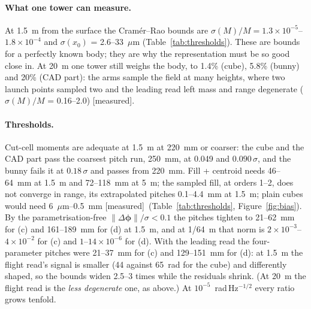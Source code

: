 \documentclass[10pt,a4paper]{article}
\newcommand{\provisional}{\textcolor{orange!70!black}{\textsf{\small[provisional --- research scripts; TASK-S5-29 regenerates this with Cavendish]}}}
\newcommand{\tagM}{\textsf{\small[measured]}}
\newcommand{\Cutcell}{Cut-cell moments}
\begin{document}
\paragraph{What one tower can measure.} At 1.5~m from the surface the Cram\'er--Rao bounds are
$\sigma(M)/M = 1.3\times10^{-5}$--$1.8\times10^{-4}$ and $\sigma(x_0)$ = 2.6--33~$\mu$m
(Table~\ref{tab:thresholds}). These are bounds for a perfectly known body; they are why the
representation must be so good close in. At 20~m one tower still weighs the body, to 1.4\% (cube),
5.8\% (bunny) and 20\% (CAD part): the arms sample the field at many heights, where two launch points
sampled two and the leading read left mass and range degenerate ($\sigma(M)/M$ = 0.16--2.0) \tagM.

\begin{table}[tbp]\centering\small
\caption{One AION-10 tower, a body passing at 1~m\,s$^{-1}$, 61 shots, $\sigma=5\times10^{-5}$~rad
per shot: the peak phase, the Cram\'er--Rao bound on the mass, and the pitch (mm) at which each
representation's largest bias over (ln $M$, $x_0$, $y_0$, $v$) stays below $0.1\,\sigma_\mathrm{CRB}$,
and (rows marked $\|\Delta\phi\|/\sigma$) at which the parametrisation-free norm of its residual
stays below 0.1, worst of three placements, at closest approach 1.5, 5 and 20~m from the surface. $^*$: extrapolated
beyond 1/128~m with the fitted order, i.e.\ not converging in range; $\geq250$: already at the coarsest
pitch run. Flight read throughout. \tagM, \texttt{paper-real-read/tables-budget.md}.
\provisional}\label{tab:thresholds}

\end{table}

\paragraph{Thresholds.} \Cutcell{} are adequate at 1.5~m at 220~mm or coarser: the cube and the CAD
part pass the coarsest pitch run, 250~mm, at 0.049 and $0.090\,\sigma$, and the bunny fails it at
$0.18\,\sigma$ and passes from 220~mm. Fill + centroid needs 46--64~mm at 1.5~m and 72--118~mm at
5~m; the sampled fill, at orders 1--2, does not converge in range, its extrapolated pitches
0.1--4.4~mm at 1.5~m; plain cubes would need 6~$\mu$m--0.5~mm \tagM\ (Table~\ref{tab:thresholds},
Figure~\ref{fig:bias}). By the parametrisation-free $\|\Delta\boldsymbol\phi\|/\sigma<0.1$ the
pitches tighten to 21--62~mm for (c) and 161--189~mm for (d) at 1.5~m, and at 1/64~m that norm is
$2\times10^{-3}$--$4\times10^{-2}$ for (c) and $1$--$14\times10^{-6}$ for (d). With the leading read
the four-parameter pitches were 21--37~mm for (c) and 129--151~mm for (d): at 1.5~m the flight read's
signal is smaller (44 against 65~rad for the cube) and differently shaped, so the bounds widen 2.5--3
times while the residuals shrink. (At 20~m the flight read is the \emph{less degenerate} one, as above.)
At $10^{-5}$~rad\,Hz$^{-1/2}$ every ratio grows tenfold.
\end{document}
